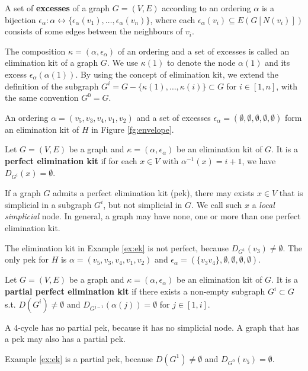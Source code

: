 \begin{definition}
A set of \textbf{excesses} of a graph $G=(V,E)$ according to an ordering $\alpha$ is a bijection $\epsilon_{\alpha}: \alpha \leftrightarrow \{\epsilon_{\alpha}(v_1), \dots, \epsilon_{\alpha}(v_n)\}$, where each $\epsilon_{\alpha}(v_i) \subseteq E(G[N(v_i)])$ consists of some edges between the neighbours of $v_i$.
\end{definition}
The composition $\kappa=(\alpha,\epsilon_{\alpha})$ of an ordering and a set of excesses is called an elimination kit of a graph $G$. We use $\kappa(1)$ to denote the node $\alpha(1)$ and its excess $\epsilon_{\alpha}(\alpha(1))$. By using the concept of elimination kit, we extend the definition of the subgraph $G^i=G-\{\kappa(1),\dots,\kappa(i)\} \subset G$ for $i\in [1,n]$, with the same convention $G^0=G$. 

\begin{example}
\label{ex:ek}
An ordering $\alpha=(v_5,v_3,v_4,v_1,v_2)$ and a set of excesses $\epsilon_{\alpha}=(\emptyset,\emptyset,\emptyset,\emptyset,\emptyset)$ form an elimination kit of $H$ in Figure \ref{fg:envelope}. 
\end{example}

\begin{definition}
Let $G=(V,E)$ be a graph and $\kappa=(\alpha, \epsilon_{\alpha})$ be an elimination kit of $G$. It is a \textbf{perfect elimination kit} if for each $x \in V$ with $\alpha^{-1}(x)=i+1$, we have $D_{G^{i}}(x)=\emptyset$.
\end{definition}
If a graph $G$ admits a perfect elimination kit (pek), there may exists $x \in V$ that is simplicial in a subgraph $G^i$, but not simplicial in $G$. We call such $x$ a \textit{local simplicial} node. In general, a graph may have none, one or more than one perfect elimination kit. 
\begin{example}
\label{ex:pek}
The elimination kit in Example \ref{ex:ek} is not perfect, because $D_{G^1}(v_3)\neq \emptyset$. The only pek for $H$ is $\alpha=(v_5,v_3,v_4,v_1,v_2)$ and $\epsilon_{\alpha}=(\{v_3v_4\},\emptyset,\emptyset,\emptyset,\emptyset)$. 
\end{example}

\begin{definition}
Let $G=(V,E)$ be a graph and $\kappa=(\alpha, \epsilon_{\alpha})$ be an elimination kit of $G$. It is a \textbf{partial perfect elimination kit} if there exists a non-empty subgraph $G^i \subset G$ s.t. $D(G^i)\neq \emptyset$ and $D_{G^{j-1}}(\alpha(j))=\emptyset$ for $j \in [1,i]$.
\end{definition}
A 4-cycle has no partial pek, because it has no simplicial node. A graph that has a pek may also has a partial pek.
\begin{example}
Example \ref{ex:ek} is a partial pek, because $D(G^1)\neq \emptyset$ and $D_{G^0}(v_5)=\emptyset$. 
\end{example}


